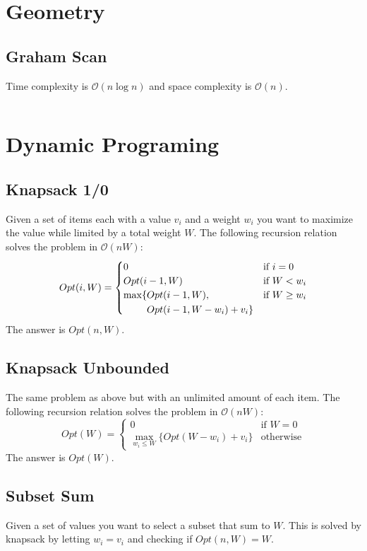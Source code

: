 \documentclass[8pt,a4paper,landscape,oneside]{amsart}
\newcommand{\code}[1]{\inputminted[fontsize=\normalsize,baselinestretch=1]{java}{code/#1}}
\newcommand{\bigO}{\mathcal{O}}
\begin{document}
\begin{multicols*}{3}
  
\section{Geometry}
  \subsection{Graham Scan}
  Time complexity is $\bigO(n\log{n})$ and space complexity is $\bigO(n)$.
  \code{Geometry/GrahamScan.java}
  
\section{Dynamic Programing}
  \subsection{Knapsack 1/0}
  Given a set of items each with a value $v_i$ and a weight $w_i$ you want to maximize the value while limited by a total weight $W$. The following recursion relation solves the problem in $\bigO(nW)$:
  \[
  Opt(i,W) = \begin{cases}
  0 & \text{if } i=0 \\
  Opt(i-1,W) & \text{if } W<w_i \\
  \begin{aligned}[t]\arraycolsep=0pt
    \max\lbrace &
      Opt(i-1,W), \\ &
      Opt(i-1,W-w_i) + v_i \rbrace
  \end{aligned} & \text{if } W \geq w_i
  \end{cases}
  \]
  The answer is $Opt(n, W)$.
  
  \subsection{Knapsack Unbounded}
  The same problem as above but with an unlimited amount of each item. The following recursion relation solves the problem in $\bigO(nW)$:
  \[
  Opt(W) = \begin{cases}
  0 & \text{if } W=0 \\
  \max\limits_{w_i \leq W} \lbrace Opt(W-w_i) + v_i \rbrace & \text{otherwise}
  \end{cases}
  \]
  The answer is $Opt(W)$.
  
  \subsection{Subset Sum}
  \label{subset-sum}
  Given a set of values you want to select a subset that sum to $W$. This is solved by knapsack by letting $w_i = v_i$ and checking if $Opt(n, W) = W$.
  

\end{multicols*}
\end{document}
